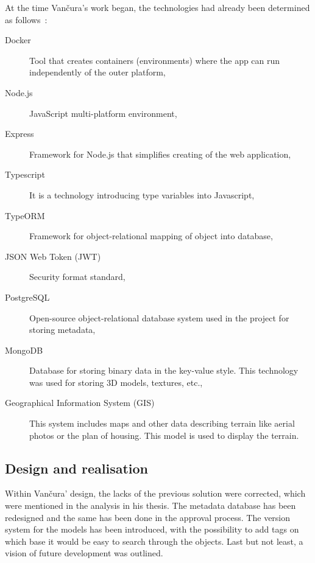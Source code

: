 \documentclass[thesis=B,english]{FITthesis}[2019/12/23]
\begin{document}
At the time Vančura's work began, the technologies had already been determined as follows~\cite{Vancura2020}:
            \begin{description}
                \item[Docker] Tool that creates containers (environments) where the app can run independently of the outer platform,
                \item[Node.js] JavaScript multi-platform environment,
                \item[Express] Framework for Node.js that simplifies creating of the web application,
                \item[Typescript] It is a technology introducing type variables into Javascript,
                \item[TypeORM] Framework for object-relational mapping of object into database,
                \item[JSON Web Token (JWT)] Security format standard,
                \item[PostgreSQL] Open-source object-relational database system used in the project for storing metadata,
                \item[MongoDB] Database for storing binary data in the key-value style. This technology was used for storing 3D models, textures, etc.,
                \item[Geographical Information System (GIS)] This system includes maps and other data describing terrain like aerial photos or the plan of housing. This model is used to display the terrain.
            \end{description}
                
        \subsection{Design and realisation}
            Within Vančura' design, the lacks of the previous solution were corrected, which were mentioned in the analysis in his thesis. The metadata database has been redesigned and the same has been done in the approval process. The version system for the models has been introduced, with the possibility to add tags on which base it would be easy to search through the objects. Last but not least, a vision of future development was outlined.
            
\end{document}
